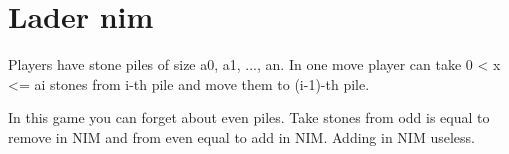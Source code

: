 \section{Lader nim}
Players have stone piles of size a0, a1, ..., an.
In one move player can take 0 < x <= ai stones 
from i-th pile and move them to (i-1)-th pile.

In this game you can forget about even piles.
Take stones from odd is equal to remove in NIM
and from even equal to add in NIM.
Adding in NIM useless. 
